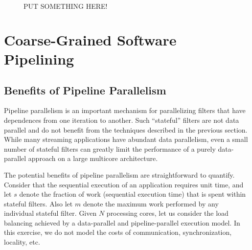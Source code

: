 \begin{figure}[t]
\caption{ PUT SOMETHING HERE!
\protect\label{fig:model-speedup}}
\end{figure}

\section{Coarse-Grained Software Pipelining}
\label{sec:softpipe}

\subsection{Benefits of Pipeline Parallelism}
\label{sec:pipeline-model}

Pipeline parallelism is an important mechanism for parallelizing
filters that have dependences from one iteration to another.  Such
``stateful'' filters are not data parallel and do not benefit from the
techniques described in the previous section.  While many streaming
applications have abundant data parallelism, even a small number of
stateful filters can greatly limit the performance of a purely
data-parallel approach on a large multicore architecture.

The potential benefits of pipeline parallelism are straightforward to
quantify.  Consider that the sequential execution of an application
requires unit time, and let $s$ denote the fraction of work
(sequential execution time) that is spent within stateful filters.
Also let $m$ denote the maximum work performed by any individual
stateful filter.  Given $N$ processing cores, let us consider the load
balancing achieved by a data-parallel and pipeline-parallel execution
model.  In this exercise, we do not model the costs of communication,
synchronization, locality, etc.

